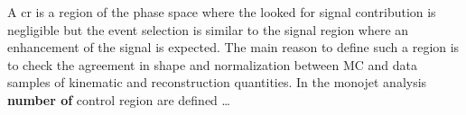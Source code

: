 A \gls{cr} is a region of the phase space where the looked for signal
contribution is negligible but the event selection is similar to the signal
region where an enhancement of the signal is expected. The main reason to define
such a region is to check the agreement in shape and normalization between MC
and data samples of kinematic and reconstruction quantities. In the monojet
analysis \textbf{number of} control region are defined \dots
